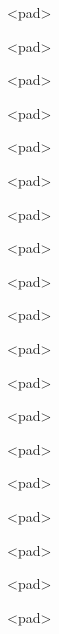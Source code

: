 \documentclass[varwidth]{standalone}
\begin{document}
\begin{CJK*}{UTF8}{gbsn}
{{{\colorbox{red!0.0}{\strut <pad>} \colorbox{red!0.0}{\strut <pad>} \colorbox{red!0.0}{\strut <pad>} \colorbox{red!0.0}{\strut <pad>} \colorbox{red!0.0}{\strut <pad>} \colorbox{red!0.0}{\strut <pad>} \colorbox{red!0.0}{\strut <pad>} \colorbox{red!0.0}{\strut <pad>} \colorbox{red!0.0}{\strut <pad>} \colorbox{red!0.0}{\strut <pad>} \colorbox{red!0.0}{\strut <pad>} \colorbox{red!0.0}{\strut <pad>} \colorbox{red!0.0}{\strut <pad>} \colorbox{red!0.0}{\strut <pad>} \colorbox{red!0.0}{\strut <pad>} \colorbox{red!0.0}{\strut <pad>} \colorbox{red!0.0}{\strut <pad>} \colorbox{red!0.0}{\strut <pad>} \colorbox{red!0.0}{\strut <pad>} 
}}}
\end{CJK*}
\end{document}
